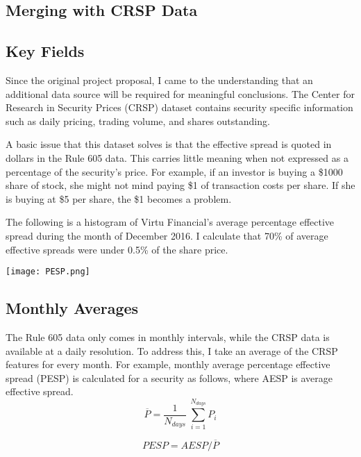 \documentclass{article}
\begin{document}
\begin{multicols}{2}
\section{Merging with CRSP Data}
\setlength{\parindent}{1cm}
\subsection{Key Fields}
Since the original project proposal, I came to the understanding that an additional data source will be required for meaningful conclusions. The Center for Research in Security Prices (CRSP) dataset contains security specific information such as daily pricing, trading volume, and shares outstanding. 
\par
A basic issue that this dataset solves is that the effective spread is quoted in dollars in the Rule 605 data. This carries little meaning when not expressed as a percentage of the security's price. For example, if an investor is buying a \$1000 share of stock, she might not mind paying \$1 of transaction costs per share. If she is buying at \$5 per share, the \$1 becomes a problem. 
\par
The following is a histogram of Virtu Financial's average percentage effective spread during the month of December 2016. I calculate that 70\% of average effective spreads were under 0.5\% of the share price.

\begingroup
    \centering
    \texttt{[image: PESP.png]}
\endgroup
\vspace{3mm}


\par 
\subsection{Monthly Averages}
The Rule 605 data only comes in monthly intervals, while the CRSP data is available at a daily resolution. To address this, I take an average of the CRSP features for every month. For example, monthly average percentage effective spread (PESP) is calculated for a security as follows, where AESP is average effective spread.
\begin{equation} \overline{P} = \frac{1}{N_{days}}\ \sum_{i = 1}^{N_{days}} P_{i}\end{equation}

\begin{equation} PESP = AESP/\overline{P} \end{equation}





\end{multicols}
\end{document}

